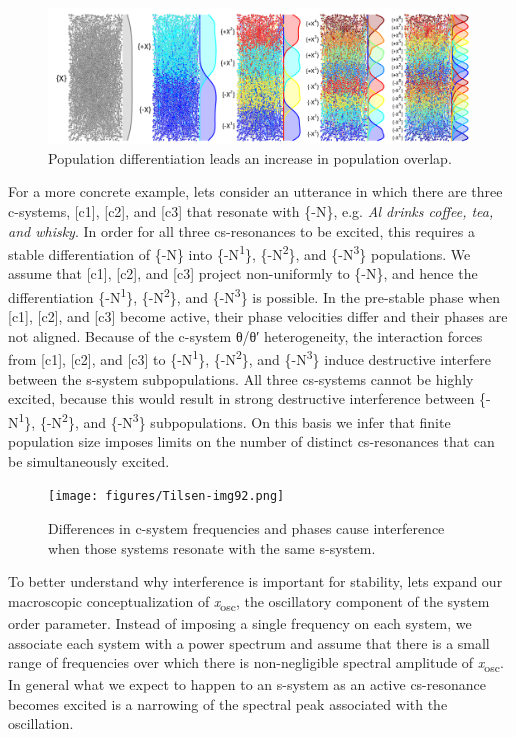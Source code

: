   
\begin{figure}
\includegraphics[width=\textwidth]{figures/Tilsen-img91.png}
\caption{Population differentiation leads an increase in population overlap.}
\label{fig:4:41}
\end{figure}
 

  For a more concrete example, lets consider an utterance in which there are three c-systems, [c1], [c2], and [c3] that resonate with \{-N\}, e.g. \textit{Al drinks coffee, tea, and whisky}. In order for all three cs-resonances to be excited, this requires a stable differentiation of \{-N\} into \{-N\textsuperscript{1}\}, \{-N\textsuperscript{2}\}, and \{-N\textsuperscript{3}\} populations. We assume that [c1], [c2], and [c3] project non-uniformly to \{-N\}, and hence the differentiation \{-N\textsuperscript{1}\}, \{-N\textsuperscript{2}\}, and \{-N\textsuperscript{3}\} is possible. In the pre-stable phase when [c1], [c2], and [c3] become active, their phase velocities differ and their phases are not aligned. Because of the c-system θ/θ′ heterogeneity, the interaction forces from [c1], [c2], and [c3] to \{-N\textsuperscript{1}\}, \{-N\textsuperscript{2}\}, and \{-N\textsuperscript{3}\} induce destructive interfere between the s-system subpopulations. All three cs-systems cannot be highly excited, because this would result in strong destructive interference between \{-N\textsuperscript{1}\}, \{-N\textsuperscript{2}\}, and \{-N\textsuperscript{3}\} subpopulations. On this basis we infer that finite population size imposes limits on the number of distinct cs-resonances that can be simultaneously excited.

  
\begin{figure}
\texttt{[image: figures/Tilsen-img92.png]}
\caption{Differences in c-system frequencies and phases cause interference when those systems resonate with the same s-system.}
\label{fig:4:42}
\end{figure}
 

  To better understand why interference is important for stability, lets expand our macroscopic conceptualization of \textit{x}\textsubscript{osc}, the oscillatory component of the system order parameter. Instead of imposing a single frequency on each system, we associate each system with a power spectrum and assume that there is a small range of frequencies over which there is non-negligible spectral amplitude of \textit{x}\textsubscript{osc}. In general what we expect to happen to an s-system as an active cs-resonance becomes excited is a narrowing of the spectral peak associated with the oscillation.

